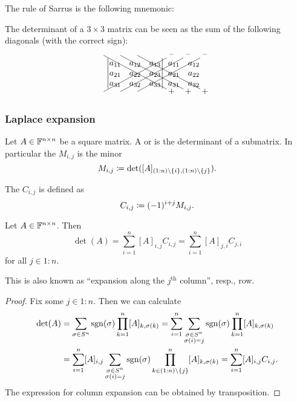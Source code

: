 The rule of Sarrus is the following mnemonic:
\begin{corollary}
The determinant of a $3\times 3$ matrix can be seen as the sum of the following diagonals (with the correct sign):
\[ \begin{tikzpicture}
\node (A) {$\begin{vmatrix}
a_{11} & a_{12} & a_{13} \\
a_{21} & a_{22} & a_{23} \\
a_{31} & a_{32} & a_{33}
\end{vmatrix}$};
\node[right of=A, node distance=5.8em] (B) {$\begin{matrix}
a_{11} & a_{12} \\
a_{21} & a_{22} \\
a_{31} & a_{32}
\end{matrix}$};
\draw (A.south west) -- ++(7.5em,4em) ++(.2,.1) node {--};
\draw (A.south west) ++(2em,0) --  ++(7.5em,4em) ++(.2,.1) node {--};
\draw (A.south west) ++(4em,0) --  ++(7.5em,4em) ++(.2,.1) node {--};
\draw (A.north west) -- ++(7.5em,-4em) ++(.2,-.1) node {+};
\draw (A.north west) ++(2em,0) --  ++(7.5em,-4em) ++(.2,-.1) node {+};
\draw (A.north west) ++(4em,0) --  ++(7.5em,-4em) ++(.2,-.1) node {+};
\end{tikzpicture} \]
\end{corollary}

\subsubsection{Laplace expansion}
\begin{definition}
Let $A\in\mathbb{F}^{n\times n}$ be a square matrix. A  or  is the determinant of a submatrix. In particular the  $M_{i,j}$ is the minor
\[ M_{i,j} \coloneqq \det([A]_{(1:n)\setminus\{i\},(1:n)\setminus\{j\}}). \]

The  $C_{i,j}$ is defined as
\[ C_{i,j} \coloneqq (-1)^{i+j}M_{i,j}. \]
\end{definition}
\begin{proposition} \label{prop:LaplaceExpansion}
Let $A\in\mathbb{F}^{n\times n}$. Then
\[ \det(A) = \sum_{i=1}^n [A]_{i,j}C_{i,j} = \sum_{i=1}^n [A]_{j,i}C_{j,i} \]
for all $j\in 1:n$.
\end{proposition}
This is also known as ``expansion along the $j^\text{th}$ column'', resp., row.
\begin{proof}
Fix some $j\in 1:n$. Then we can calculate
\begin{align*}
\det(A) &=  \sum_{\sigma\in S^n}\operatorname{sgn}(\sigma)\prod_{k=1}^n[A]_{k,\sigma(k)} = \sum_{i=1}^n\sum_{\substack{\sigma\in S^n \\ \sigma(i)=j}}\operatorname{sgn}(\sigma)\prod_{k=1}^n[A]_{k,\sigma(k)} \\
&= \sum_{i=1}^n [A]_{i,j}\sum_{\substack{\sigma\in S^n \\ \sigma(i)=j}}\operatorname{sgn}(\sigma)\prod_{k\in (1:n)\setminus\{j\}}^n[A]_{k,\sigma(k)} = \sum_{i=1}^n [A]_{i,j}C_{i,j}.
\end{align*}
The expression for column expansion can be obtained by transposition.
\end{proof}

